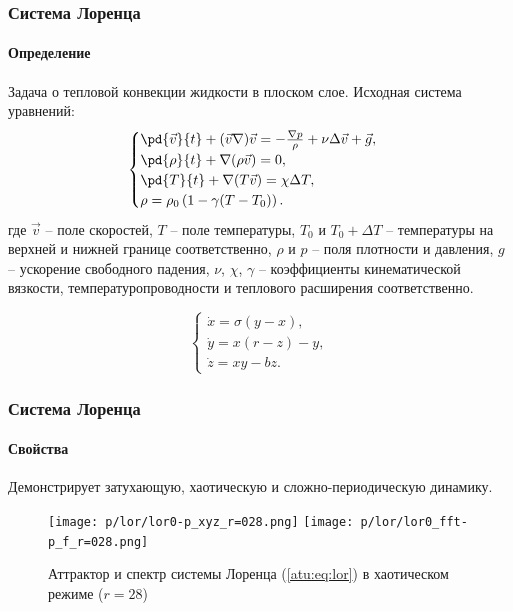 \documentclass[10pt,utf8]{beamer}
\begin{document}
\begin{frame}
  \frametitle{Система Лоренца}
  \framesubtitle{Определение}

Задача о тепловой конвекции жидкости в плоском слое. Исходная система уравнений:
%
  \begin{equation}
  \begin{cases}
    \pd{\vec{v}}{t} + ( \vec{v} \nabla ) \vec{v} = - \frac{\nabla p}{\rho} + \nu \Delta \vec{v} + \vec{g}, \\
    \pd{\rho}{t} + \nabla ( \rho \vec{v} ) = 0 , \\
    \pd{T}{t} +\nabla ( T \vec{v} ) = \chi \Delta T , \\
    \rho = \rho_0 \left( 1 - \gamma (T - T_0) \right) .
  \end{cases}
  \label{atu:eq:lor_gidro}
  \end{equation}
  где
  $\vec{v} $   -- поле скоростей,
  $T$ -- поле температуры,
  $T_0$ и $T_0+\Delta T$   -- температуры на верхней и нижней границе соответственно,
  $\rho$ и $p$ -- поля плотности и давления,
  $g$ -- ускорение свободного падения,
  $\nu$, $\chi$, $\gamma$  -- коэффициенты кинематической вязкости, температуропроводности и
  теплового расширения соответственно.

%
  \begin{equation}
  \begin{cases}
    \dot{x} = \sigma (y-x ) , \\
    \dot{y} = x (r-z) - y , \\
    \dot{z} = x y - b z .
  \end{cases}
  \label{atu:eq:lor}
  \end{equation}

\end{frame}




\begin{frame}
  \frametitle{Система Лоренца}
  \framesubtitle{Свойства}

  Демонстрирует затухающую, хаотическую и сложно-периодическую динамику.

  \begin{figure}[h!]
  \begin{center}
    \texttt{[image: p/lor/lor0-p\_xyz\_r=028.png]}
    \hfill
    \texttt{[image: p/lor/lor0\_fft-p\_f\_r=028.png]}
  \end{center}
    \caption{Аттрактор и спектр системы Лоренца (\ref{atu:eq:lor}) в хаотическом режиме ($r=28$)}
  \label{atu:f:lor_attractor_phase_chaos28}
  \end{figure}

\end{frame}
\end{document}
